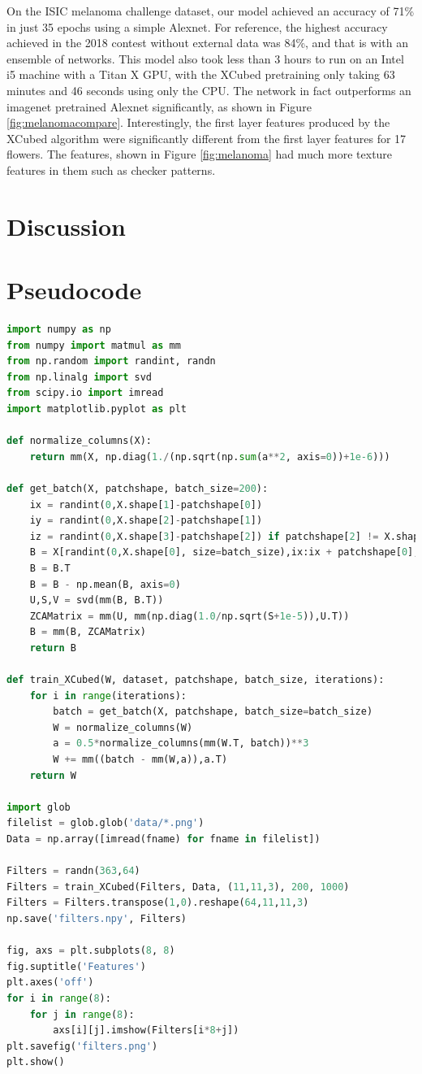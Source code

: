 \documentclass[twocolumn]{article}
\begin{document}
On the ISIC melanoma challenge dataset\cite{melanoma1}\cite{melanoma2}, our model achieved an accuracy of 71\% in just 35 epochs using a simple Alexnet. For reference, the highest accuracy achieved in the 2018 contest without external data was 84\%, and that is with an ensemble of networks. This model also took less than 3 hours to run on an Intel i5 machine with a Titan X GPU, with the XCubed pretraining only taking 63 minutes and 46 seconds using only the CPU. The network in fact outperforms an imagenet pretrained Alexnet significantly, as shown in Figure \ref{fig:melanomacompare}. Interestingly, the first layer features produced by the XCubed algorithm were significantly different from the first layer features for 17 flowers. The features, shown in Figure \ref{fig:melanoma} had much more texture features in them such as checker patterns.
\section{Discussion}
\section{Pseudocode}
\begin{lstlisting}[language=Python]
import numpy as np
from numpy import matmul as mm
from np.random import randint, randn
from np.linalg import svd
from scipy.io import imread
import matplotlib.pyplot as plt

def normalize_columns(X):
    return mm(X, np.diag(1./(np.sqrt(np.sum(a**2, axis=0))+1e-6)))

def get_batch(X, patchshape, batch_size=200):
    ix = randint(0,X.shape[1]-patchshape[0])
    iy = randint(0,X.shape[2]-patchshape[1])
    iz = randint(0,X.shape[3]-patchshape[2]) if patchshape[2] != X.shape[3] else 0
    B = X[randint(0,X.shape[0], size=batch_size),ix:ix + patchshape[0],iy:iy + patchshape[1],iz:iz + patchshape[2]].reshape(batch_size, patchshape[0]*patchshape[1]*patchshape[2])
    B = B.T
    B = B - np.mean(B, axis=0)
    U,S,V = svd(mm(B, B.T))
    ZCAMatrix = mm(U, mm(np.diag(1.0/np.sqrt(S+1e-5)),U.T))
    B = mm(B, ZCAMatrix)
    return B

def train_XCubed(W, dataset, patchshape, batch_size, iterations):
    for i in range(iterations):
        batch = get_batch(X, patchshape, batch_size=batch_size)
        W = normalize_columns(W)
        a = 0.5*normalize_columns(mm(W.T, batch))**3
        W += mm((batch - mm(W,a)),a.T)
    return W

import glob
filelist = glob.glob('data/*.png')
Data = np.array([imread(fname) for fname in filelist])

Filters = randn(363,64)
Filters = train_XCubed(Filters, Data, (11,11,3), 200, 1000)
Filters = Filters.transpose(1,0).reshape(64,11,11,3)
np.save('filters.npy', Filters)

fig, axs = plt.subplots(8, 8)
fig.suptitle('Features')
plt.axes('off')
for i in range(8):
    for j in range(8):
        axs[i][j].imshow(Filters[i*8+j])
plt.savefig('filters.png')
plt.show()
\end{lstlisting}
\nocite{*}


\end{document}
